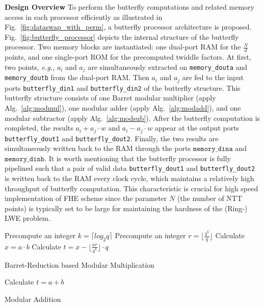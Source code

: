 \documentclass[submission]{iacrtrans}
\theoremstyle{plain}
\begin{document}
\textbf{Design Overview} To perform the butterfly computations and related memory access in each processor efficiently as illustrated in Fig.~\ref{fig:dataswap_with_perm}, a butterfly processor architecture is proposed. Fig.~\ref{fig:butterfly_processor} depicts the internal structure of the butterfly processor. Two memory blocks are instantiated: one dual-port RAM for the $\frac{N}{d}$ points,
and one single-port ROM for the precomputed twiddle factors. At first, two points, \textit{e.g.,} $a_i$ and $a_j$ are simultaneously extracted on \texttt{memory\_douta} and \texttt{memory\_doutb} from the dual-port RAM. Then $a_i$ and $a_j$ are fed to the input ports \texttt{butterfly\_din1} and \texttt{butterfly\_din2} of the butterfly structure. This butterfly structure consists of one Barret modular multiplier (apply Alg.~\ref{alg:modmul}), one modular adder (apply Alg.~\ref{alg:modadd}), and one modular subtractor (apply Alg.~\ref{alg:modsub}). After the butterfly computation is completed, the results $a_i+a_j\cdot w$ and $a_i-a_j\cdot w$ appear at the output ports \texttt{butterfly\_dout1} and \texttt{butterfly\_dout2}. Finally, the two results are simultaneously written back to the RAM through the ports $\texttt{memory\_dina}$ and $\texttt{memory\_dinb}$. It is worth mentioning that
the butterfly processor is fully pipelined such that a pair of valid data \texttt{butterfly\_dout1} and \texttt{butterfly\_dout2} is written back to the RAM every clock cycle, which maintains a relatively high throughput of butterfly computation. This characteristic is crucial for high speed implementation of FHE scheme since the parameter $N$ (the number of NTT points) is typically set to be large for maintaining the hardness of the (Ring-) LWE problem.  


\begin{algorithm}[!tbh]
 \DontPrintSemicolon %
    Precompute an integer $k=\lceil log_2q\rceil$\;
    Precompute an integer $r=\lfloor \frac{4^k}{q}\rfloor$\;
    Calculate $x=a\cdot b$\;
    Calculate $t = x - \lfloor\frac{xr}{4^k}\rfloor\cdot q$\;
     
    
 \caption{Barret-Reduction based Modular Multiplication}\label{alg:modmul}
\end{algorithm}

\begin{algorithm}[!tbh]
 \DontPrintSemicolon %
    Calculate $t=a+b$\;
     
    
 \caption{Modular Addition}\label{alg:modadd}
\end{algorithm}
\end{document}
